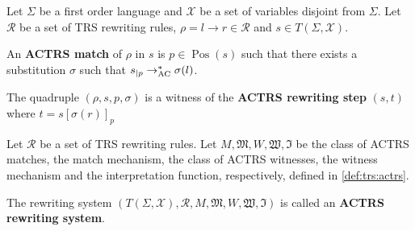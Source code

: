 \begin{definition}
  \label{def:trs:actrs}
  Let $\Sigma$ be a first order language and $\mathcal{X}$ be a set of variables disjoint from $\Sigma$.
  Let $\mathcal{R}$ be a set of TRS rewriting rules, $\rho = l \to r \in \mathcal{R}$ and $s \in T(\Sigma, \mathcal{X})$.

  An \textbf{ACTRS match} of $\rho$ in $s$ is $p \in \operatorname{Pos}(s)$ such that there exists a substitution $\sigma$ such that $s_{|p} \rightarrow_{\operatorname{AC}}^* \sigma(l)$. 


  The quadruple $(\rho, s, p, \sigma)$ is a witness of the \textbf{ACTRS rewriting step} $(s, t)$ where $t = s[\sigma(r)]_p$

\end{definition}

   


\begin{definition}
  Let $\mathcal{R}$ be a set of TRS rewriting rules. 
  Let $M, \mathfrak{M}, W, \mathfrak{W}, \mathfrak{I}$ be the class of ACTRS matches, the match mechanism, the class of ACTRS witnesses, the witness mechanism and the interpretation function, respectively, defined in \autoref{def:trs:actrs}.

  The rewriting system $(T(\Sigma,\mathcal{X}), \mathcal{R}, M, \mathfrak{M}, W, \mathfrak{W}, \mathfrak{I})$ is called an \textbf{ACTRS rewriting system}.
\end{definition}


